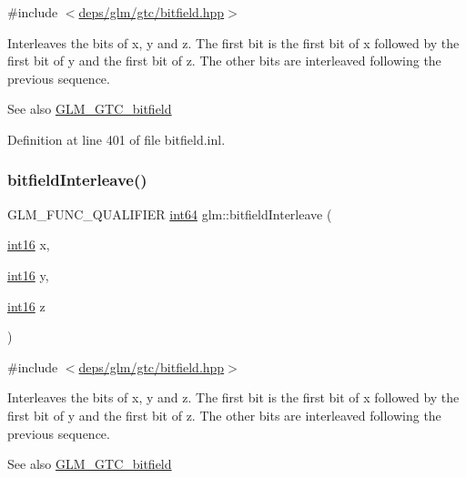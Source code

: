 {\ttfamily \#include $<$\hyperlink{bitfield_8hpp}{deps/glm/gtc/bitfield.\+hpp}$>$}

Interleaves the bits of x, y and z. The first bit is the first bit of x followed by the first bit of y and the first bit of z. The other bits are interleaved following the previous sequence.

\begin{DoxySeeAlso}{See also}
\hyperlink{group__gtc__bitfield}{G\+L\+M\+\_\+\+G\+T\+C\+\_\+bitfield} 
\end{DoxySeeAlso}


Definition at line 401 of file bitfield.\+inl.

\mbox{\label{group__gtc__bitfield_gaf898f842ac089fcc8d6201c32702584a}} 
\subsubsection{\texorpdfstring{bitfield\+Interleave()}{bitfieldInterleave()}\hspace{0.1cm}{\footnotesize\ttfamily [9/16]}}
{\footnotesize\ttfamily G\+L\+M\+\_\+\+F\+U\+N\+C\+\_\+\+Q\+U\+A\+L\+I\+F\+I\+ER \hyperlink{group__gtc__type__precision_ga435d75819cce297cc5fa21bd84ef89a5}{int64} glm\+::bitfield\+Interleave (\begin{DoxyParamCaption}\item[{\hyperlink{group__gtc__type__precision_ga2945a61d12771f8954994fcddf02b021}{int16}}]{x,  }\item[{\hyperlink{group__gtc__type__precision_ga2945a61d12771f8954994fcddf02b021}{int16}}]{y,  }\item[{\hyperlink{group__gtc__type__precision_ga2945a61d12771f8954994fcddf02b021}{int16}}]{z }\end{DoxyParamCaption})}



{\ttfamily \#include $<$\hyperlink{bitfield_8hpp}{deps/glm/gtc/bitfield.\+hpp}$>$}

Interleaves the bits of x, y and z. The first bit is the first bit of x followed by the first bit of y and the first bit of z. The other bits are interleaved following the previous sequence.

\begin{DoxySeeAlso}{See also}
\hyperlink{group__gtc__bitfield}{G\+L\+M\+\_\+\+G\+T\+C\+\_\+bitfield} 
\end{DoxySeeAlso}


